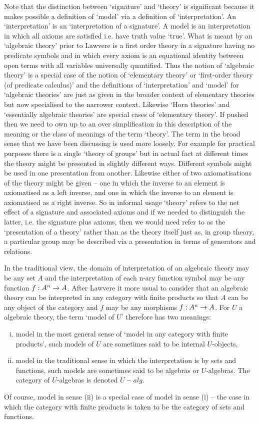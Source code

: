 \note
Note that the distinction between `signature' and `theory' is significant because it makes possible a definition of `model' 
via a definition of `interpretation'. An `interpretation' is an `interpretation of a signature'. 
A model is an interpretation in which all axioms are satisfied i.e. have truth value `true'.   
\note
What is meant by an `algebraic theory' prior to Lawvere is a first order theory in a signature having no predicate symbols and in which every axiom is an equational identity between open terms with all variables universally quantified. Thus the notion of `algebraic theory' is  
 a special case of the notion of `elementary theory' or `first-order theory (of predicate calculus)' and the 
definitions of `interpretation' and `model' for `algebraic theories' are just as given in the broader context of elementary theories but now specialised to the narrower context. Likewise  `Horn theories' and `essentially algebraic theories' are special cases of `elementary theory'. 
\note If pushed then we need to own up to an  over simplification in this description of the meaning or the class of meanings of the term `theory'.
The term in the broad sense that we have been discussing is used more loosely. For example for practical purposes there is a single `theory of groups'  but in actual fact at different times the theory might be presented in slightly different ways. Different symbols might be used in one presentation from another. Likewise either of two axiomatisations of the theory might be given -- one in which the inverse to an element is axiomatised as a left inverse, and one in which the inverse to an element is axiomatised as a right inverse.
So in informal usage `theory' refers to the net effect of a signature and associated axioms  and if we needed to distinguish the latter, i.e. the signature plus axioms, then we would need refer to as the `presentation of a theory' rather than as the theory itself just as, in group theory, a particular group may be described via a presentation in terms of generators and relations.  

\note
In the traditional view, the domain of interpretation of an algebraic theory may be any set $A$ 
and the interpretation of each n-ary function symbol may be any function $f:A^n \rightarrow A$.
After Lawvere it more usual to consider that an algebraic theory can be interpreted in any category with finite products
 so that $A$ can be any object of the category and  $f$ may be any morphisms $f:A^n \rightarrow A$. 
For $U$ a algebraic theory, the term `model of $U$' therefore has two meanings:
\begin{enumerate}[(i)]
\item model in the most general sense of `model in any category  with finite products',
 such models of $U$ are sometimes said to be internal $U$-objects,
\item model in the traditional sense in which the interpretation is by sets and functions, such models are sometimes said to be algebras or
$U$-algebras. The category of $U$-algebras is denoted $U-alg$. 
\end{enumerate} 
Of course, model in sense (ii) is a special case of model in sense (i) --  the case in which the category with finite products is taken to be the category of sets and functions.

